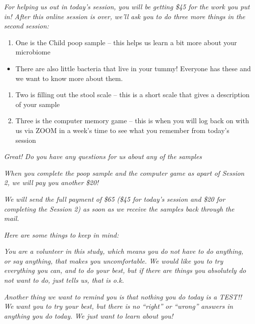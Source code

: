 \documentclass[]{book}
\providecommand{\tightlist}{%
  \setlength{\itemsep}{0pt}\setlength{\parskip}{0pt}}
\begin{document}
\emph{For helping us out in today's session, you will be getting \$45 for the work you put in! After this online session is over, we'll ask you to do three more things in the second session:}

\begin{enumerate}
\def\labelenumi{\arabic{enumi}.}
\tightlist
\item
  One is the Child poop sample -- this helps us learn a bit more about your microbiome
\end{enumerate}

\begin{itemize}
\tightlist
\item
  There are also little bacteria that live in your tummy! Everyone has these and we want to know more about them.
\end{itemize}

\begin{enumerate}
\def\labelenumi{\arabic{enumi}.}
\setcounter{enumi}{1}
\tightlist
\item
  Two is filling out the stool scale -- this is a short scale that gives a description of your sample
\item
  Three is the computer memory game -- this is when you will log back on with us via ZOOM in a week's time to see what you remember from today's session
\end{enumerate}

\emph{Great! Do you have any questions for us about any of the samples}

\emph{When you complete the poop sample and the computer game as apart of Session 2, we will pay you another \$20!}

\emph{We will send the full payment of \$65 (\$45 for today's session and \$20 for completing the Session 2) as soon as we receive the samples back through the mail.}

\emph{Here are some things to keep in mind:}

\emph{You are a volunteer in this study, which means you do not have to do anything, or say anything, that makes you uncomfortable. We would like you to try everything you can, and to do your best, but if there are things you absolutely do not want to do, just tells us, that is o.k.}

\emph{Another thing we want to remind you is that nothing you do today is a TEST!! We want you to try your best, but there is no ``right'' or ``wrong'' answers in anything you do today. We just want to learn about you!}
\end{document}

